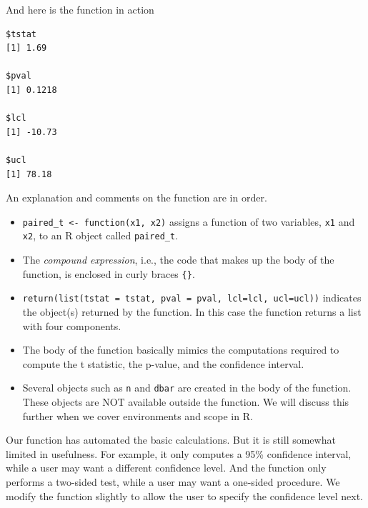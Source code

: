 \documentclass[
]{krantz}
\makeatletter
\newenvironment{Shaded}{\begin{snugshade}}{\end{snugshade}}
\newcommand{\DataTypeTok}[1]{\textcolor[rgb]{0.27,0.27,0.27}{#1}}
\newcommand{\KeywordTok}[1]{\textcolor[rgb]{0.27,0.27,0.27}{\textbf{#1}}}
\newcommand{\NormalTok}[1]{#1}
\newcommand{\OperatorTok}[1]{\textcolor[rgb]{0.43,0.43,0.43}{\textbf{#1}}}
\newcommand{\StringTok}[1]{\textcolor[rgb]{0.5,0.5,0.5}{#1}}
\providecommand{\tightlist}{%
  \setlength{\itemsep}{0pt}\setlength{\parskip}{0pt}}
\newenvironment{kframe}{%
\medskip{}
\setlength{\fboxsep}{.8em}
 \def\at@end@of@kframe{}%
 \ifinner\ifhmode%
  \def\at@end@of@kframe{\end{minipage}}%
  \begin{minipage}{\columnwidth}%
 \fi\fi%
 \def\FrameCommand##1{\hskip\@totalleftmargin \hskip-\fboxsep
 \colorbox{shadecolor}{##1}\hskip-\fboxsep
     \hskip-\linewidth \hskip-\@totalleftmargin \hskip\columnwidth}%
 \MakeFramed {\advance\hsize-\width
   \@totalleftmargin\z@ \linewidth\hsize
   \@setminipage}}%
 {\par\unskip\endMakeFramed%
 \at@end@of@kframe}
\renewenvironment{Shaded}{\begin{kframe}}{\end{kframe}}
\makeatother
\begin{document}
And here is the function in action

\begin{Shaded}
\end{Shaded}

\begin{verbatim}
$tstat
[1] 1.69

$pval
[1] 0.1218

$lcl
[1] -10.73

$ucl
[1] 78.18
\end{verbatim}

An explanation and comments on the function are in order.

\begin{itemize}
\tightlist
\item
  \texttt{paired\_t\ \textless{}-\ function(x1,\ x2)} assigns a function of two variables, \texttt{x1} and \texttt{x2}, to an R object called \texttt{paired\_t}.
\item
  The \emph{compound expression}, i.e., the code that makes up the body of the function, is enclosed in curly braces \texttt{\{\}}.
\item
  \texttt{return(list(tstat\ =\ tstat,\ pval\ =\ pval,\ lcl=lcl,\ ucl=ucl))} indicates the object(s) returned by the function. In this case the function returns a list with four components.
\item
  The body of the function basically mimics the computations required to compute the t statistic, the p-value, and the confidence interval.
\item
  Several objects such as \texttt{n} and \texttt{dbar} are created in the body of the function. These objects are NOT available outside the function. We will discuss this further when we cover environments and scope in R.
\end{itemize}

Our function has automated the basic calculations. But it is still somewhat limited in usefulness. For example, it only computes a 95\% confidence interval, while a user may want a different confidence level. And the function only performs a two-sided test, while a user may want a one-sided procedure. We modify the function slightly to allow the user to specify the confidence level next.
\end{document}
